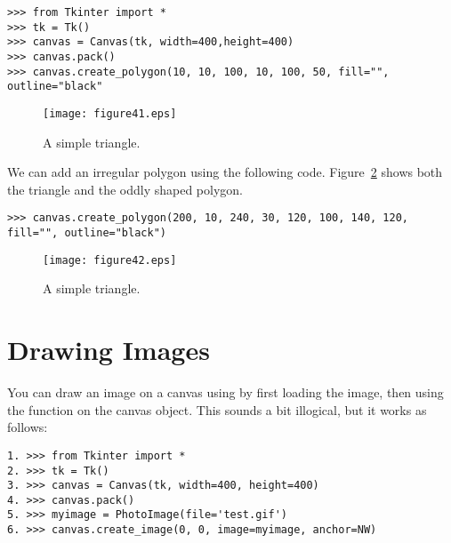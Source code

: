 \begin{listing}
\begin{verbatim}
>>> from Tkinter import *
>>> tk = Tk()
>>> canvas = Canvas(tk, width=400,height=400)
>>> canvas.pack()
>>> canvas.create_polygon(10, 10, 100, 10, 100, 50, fill="", outline="black"
\end{verbatim}
\end{listing}

\begin{figure}
\begin{center}
\texttt{[image: figure41.eps]}
\end{center}
\caption{A simple triangle.}\label{fig41}
\end{figure}

We can add an irregular polygon using the following code. Figure~\ref{fig42} shows both the triangle and the oddly shaped polygon.

\begin{listing}
\begin{verbatim}
>>> canvas.create_polygon(200, 10, 240, 30, 120, 100, 140, 120, fill="", outline="black")
\end{verbatim}
\end{listing}

\begin{figure}
\begin{center}
\texttt{[image: figure42.eps]}
\end{center}
\caption{A simple triangle.}\label{fig42}
\end{figure}

\section{Drawing Images}

You can draw an image on a canvas using  by first loading the image, then using the  function on the canvas object. This sounds a bit illogical, but it works as follows:

\begin{listing}
\begin{verbatim}
1. >>> from Tkinter import *
2. >>> tk = Tk()
3. >>> canvas = Canvas(tk, width=400, height=400)
4. >>> canvas.pack()
5. >>> myimage = PhotoImage(file='test.gif')
6. >>> canvas.create_image(0, 0, image=myimage, anchor=NW)
\end{verbatim}
\end{listing}

